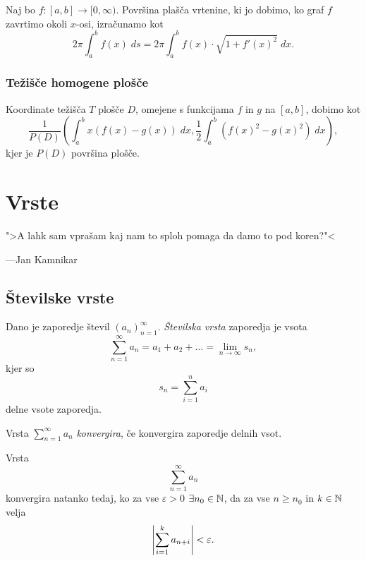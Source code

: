 \documentclass[12pt, a4paper]{article}
\begin{document}
\begin{trditev}
Naj bo $f\colon[a,b]\to[0,\infty)$. Površina plašča vrtenine, ki jo dobimo, ko graf $f$ zavrtimo okoli $x$-osi, izračunamo kot
\[
2\pi\int_a^b f(x)\;ds=2\pi\int_a^b f(x)\cdot\sqrt{1+f'(x)^2}\;dx.
\]
\end{trditev}

\subsubsection{Težišče homogene plošče}

\begin{trditev}
Koordinate težišča $T$ plošče $D$, omejene s funkcijama $f$ in $g$ na $[a,b]$, dobimo kot
\[
\frac{1}{P(D)}\left(\int_a^b x\left(f(x)-g(x)\right)\;dx, \frac{1}{2}\int_a^b\left(f(x)^2-g(x)^2\right)\;dx\right),
\]
kjer je $P(D)$ površina plošče.
\end{trditev}

\newpage

\section{Vrste}

\epigraph{">A lahk sam vprašam kaj nam to sploh pomaga da damo to pod koren?"<}{---Jan Kamnikar}

\subsection{Številske vrste}

\begin{okvir}
\begin{definicija}
Dano je zaporedje števil $(a_n)_{n=1}^\infty$. \emph{Številska vrsta} zaporedja je vsota
\[
\sum_{n=1}^\infty a_n=a_1+a_2+\dots=\lim_{n\to\infty}s_n,
\]
kjer so
\[
s_n=\sum_{i=1}^n a_i
\]
delne vsote zaporedja.
\end{definicija}
\end{okvir}

\begin{definicija}
Vrsta $\displaystyle\sum_{n=1}^\infty a_n$ \emph{konvergira}, če konvergira zaporedje delnih vsot.
\end{definicija}

\begin{izrek}
Vrsta
\[
\sum_{n=1}^\infty a_n
\]
konvergira natanko tedaj, ko za vse $\varepsilon>0$ $\exists n_0\in\mathbb{N}$, da za vse $n\geq n_0$ in $k\in\mathbb{N}$ velja
\[
\left\lvert \sum_{i=1}^k a_{n+i}\right\rvert<\varepsilon.
\]
\end{izrek}
\end{document}
